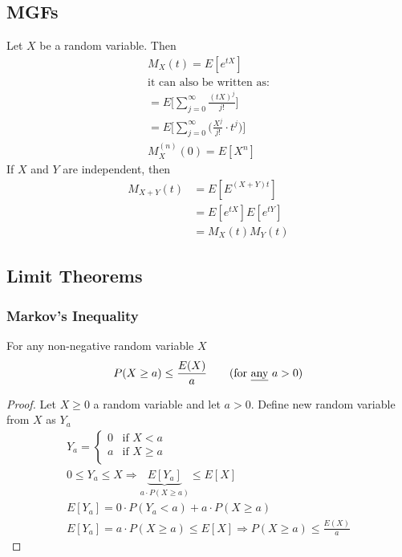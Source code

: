 \subsection*{MGFs}
Let $X$ be a random variable. Then
\begin{gather*}
	M_X(t) = E[e^{tX}]\\
	\text{it can also be written as:}\\
	 = E\bigg[ \sum\limits_{j = 0}^{\infty} \frac{(tX)^j}{j!} \bigg]\\
	 = E\bigg[ \sum\limits_{j = 0}^{\infty} \bigg(\frac{X^j}{j!} \cdot t^j\bigg) \bigg]\\
	 \boxed{M_X^{(n)} (0) = E[X^n]}
\end{gather*}
If $X$ and $Y$ are independent, then
	\begin{align*}
		M_{X+Y}(t) & = E[E^{(X+Y)t}]\\
		& = E[e^{tX}]E[e^{tY}]\\
		& = M_X(t) M_Y(t)
	\end{align*}

\subsection*{Limit Theorems}
\subsubsection*{Markov's Inequality}
For any non-negative random variable $X$
\begin{equation*}
	P(X \geq a) \leq \frac{E(X)}{a} \tag{for \underline{any} $a > 0$}
\end{equation*}
\begin{proof}
	Let $X \geq 0$ a random variable and let $a > 0$.
	Define new random variable from $X$ as $Y_a$
	\begin{gather*}
		Y_a =
		\begin{cases}
 		0 & \text{if }	X < a\\
 		a & \text{if }	X \geq a\\
		 \end{cases}\\
		0 \leq Y_a \leq X \Longrightarrow \underbrace{E[Y_a]}_{a\cdot P(X \geq a)} \leq E[X]\\
		E[Y_a] = 0 \cdot P(Y_a < a) + a\cdot P(X \geq a)\\
		 E[Y_a] = a\cdot P(X \geq a) \leq E[X] \Longrightarrow \boxed{P(X \geq a) \leq \frac{E(X)}{a}}
	\end{gather*}

\end{proof}
